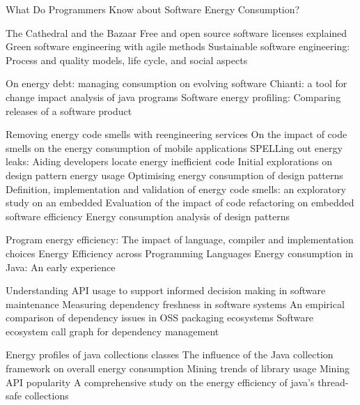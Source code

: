 \citep{Pang2016} What Do Programmers Know about Software Energy Consumption?

\citep{Raymond1999} The Cathedral and the Bazaar
\citep{Ballhausen2019} Free and open source software licenses explained
\citep{Dick2013} Green software engineering with agile methods
\citep{Naumann2015} Sustainable software engineering: Process and quality models, life cycle, and social aspects


\citep{Couto2020} On energy debt: managing consumption on evolving software
\citep{Ren2004} Chianti: a tool for change impact analysis of java programs
\citep{Jagroep2016} Software energy profiling: Comparing releases of a software product


\citep{Gottschalk2012} Removing energy code smells with reengineering services
\citep{Palomba2019} On the impact of code smells on the energy consumption of mobile applications
\citep{Pereira2020} SPELLing out energy leaks: Aiding developers locate energy inefficient code
\citep{Sahin2012} Initial explorations on design pattern energy usage
\citep{Noureddine2015a} Optimising energy consumption of design patterns
\citep{Vetro2013} Definition, implementation and validation of energy code smells: an exploratory study on an embedded 
\citep{daSilva2010} Evaluation of the impact of code refactoring on embedded software efficiency
\citep{Litke2005} Energy consumption analysis of design patterns


\citep{Abdulsalam2014} Program energy efficiency: The impact of language, compiler and implementation choices
\citep{Pereira2017} Energy Efficiency across Programming Languages
\citep{Kumar2017} Energy consumption in Java: An early experience


\citep{Bauer2012a} Understanding API usage to support informed decision making in software maintenance
\citep{Cox2015} Measuring dependency freshness in software systems
\citep{Decan2017} An empirical comparison of dependency issues in OSS packaging ecosystems
\citep{Hejderup2018} Software ecosystem call graph for dependency management

\citep{Hasan2016} Energy profiles of java collections classes
\citep{Pereira2016} The influence of the Java collection framework on overall energy consumption
\citep{Mileva2009} Mining trends of library usage
\citep{Mileva2010} Mining API popularity
\citep{Pinto2016} A comprehensive study on the energy efficiency of java’s thread-safe collections

